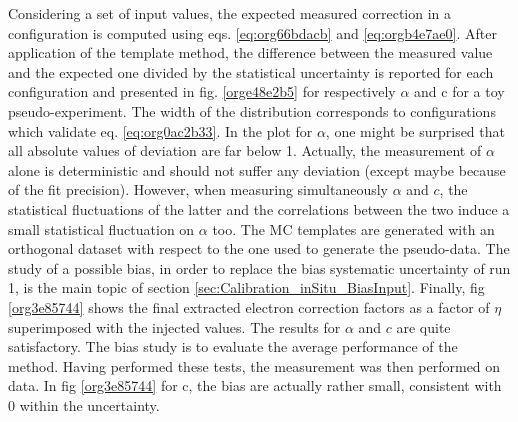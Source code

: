 Considering a set of input values, the expected measured correction in a configuration is computed using eqs. \ref{eq:org66bdacb} and \ref{eq:orgb4e7ae0}.
After application of the template method, the difference between the measured value and the expected one divided by the statistical uncertainty is reported for each configuration and presented in fig. \ref{orge48e2b5} for respectively \(\alpha\) and c for a toy pseudo-experiment.
The width of the distribution corresponds to configurations which validate eq. \ref{eq:org0ac2b33}.
In the plot for $\alpha$, one might be surprised that all absolute values of deviation are far below 1.
Actually, the measurement of $\alpha$ alone is deterministic and should not suffer any deviation (except maybe because of the fit precision).
However, when measuring simultaneously $\alpha$ and $c$, the statistical fluctuations of the latter and the correlations between the two induce a small statistical fluctuation on $\alpha$ too.
The MC templates are generated with an orthogonal dataset with respect to the one used to generate the pseudo-data.
The study of a possible bias, in order to replace the bias systematic uncertainty of run 1, is the main topic of section \ref{sec:Calibration_inSitu_BiasInput}.
Finally, fig \ref{org3e85744} shows the final extracted electron correction factors as a factor of $\eta$ superimposed with the injected values.
The results for $\alpha$ and $c$ are quite satisfactory.
The bias study is to evaluate the average performance of the method.
Having performed these tests, the measurement was then performed on data.
In fig \ref{org3e85744} for c, the bias are actually rather small, consistent with 0 within the uncertainty.

